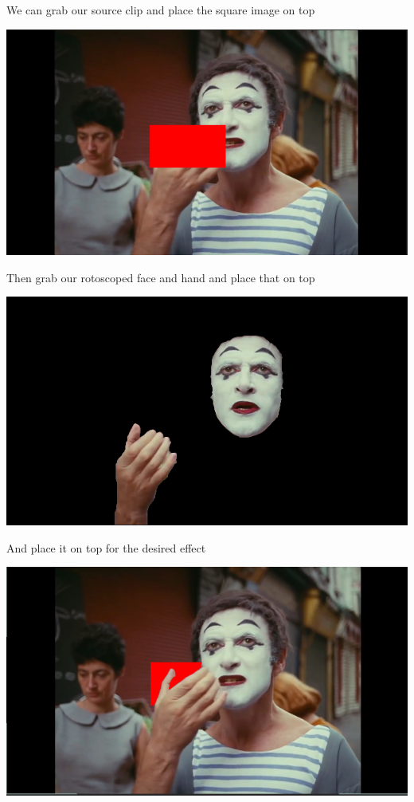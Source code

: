 \documentclass[11pt]{article}
\begin{document}
\begin{enumerate}
We can grab our source clip and place the square image on top
  \begin{center}
\includegraphics[width=.9\linewidth]{./roto/halfcomp.PNG}
\end{center}
Then grab our rotoscoped face and hand and place that on top
  \begin{center}
\includegraphics[width=.9\linewidth]{./roto/void.PNG}
\end{center}
And place it on top for the desired effect

\begin{center}
\includegraphics[width=.9\linewidth]{./roto/behind.PNG}
\end{center}
\end{enumerate}
\end{document}
